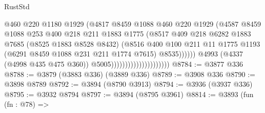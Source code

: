 \begin{lexlean}{RustStd}
\begin{coremodule}
                                                  @460
                                                  @220
                                                  @1180
                                                  @1929
                                                  (@4817
                                                    @8459
                                                    @1088
                                                    @460
                                                    @220
                                                    @1929
                                                    (@4587
                                                      @8459
                                                      @1088
                                                      @253
                                                      @400
                                                      @218
                                                      @211
                                                      @1883
                                                      @1775
                                                      (@8517
                                                        @409
                                                        @218
                                                        @6282
                                                        @1883
                                                        @7685
                                                        (@8525 @1883 @8528 @8432)
                                                        (@8516
                                                          @400
                                                          @100
                                                          @211
                                                          @11
                                                          @1775
                                                          @1193
                                                          (@6291 @8459 @1088 @231 @211 @1774 @7615)
                                                          @8535))))))
                                              @4993
                                              (@4337 (@4998 @435 @475 @360))
                                              @5005)))))))))))))))))))))
@8784 := @3877 @336
@8788 := @3879 (@3883 @336) (@3889 @336)
@8789 := @3908 @336
@8790 := @3898 @8789
@8792 := @3894 (@8790 @3913)
@8794 := @3936 (@3937 @336)
@8795 := @3932 @8794
@8797 := @3894 (@8795 @3961)
@8814 := @3893
    (fun (fn : @78) =>

\end{coremodule}
\end{lexlean}
